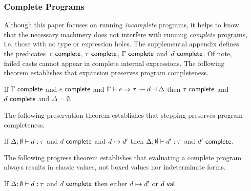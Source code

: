 \subsubsection{Complete Programs}
%
Although this paper focuses on running \emph{incomplete} programs, it helps
to know that the necessary machinery does not interfere
with running \emph{complete} programs, i.e. those
with no type or expression holes.
%
The supplemental appendix defines the predicates~$e~\mathsf{complete}$, $\tau~\mathsf{complete}$, $\Gamma~\mathsf{complete}$ and~$d~\mathsf{complete}$.
%
Of note, failed casts cannot appear in complete internal expressions.
%
The following theorem establishes that expansion preserves program completeness.

\begin{thm} 
      If $\Gamma~\mathsf{complete}$ and $e~\mathsf{complete}$
      and $\Gamma \vdash e \Rightarrow \tau \leadsto d \dashv \Delta$
      then $\tau~\mathsf{complete}$ and $d~\mathsf{complete}$ and $\Delta = \emptyset$.
\end{thm}

The following preservation theorem establishes that stepping preserves program completeness.
\begin{thm}
  If $\Delta; \emptyset \vdash d : \tau$
  and $d~\mathsf{complete}$
  and $d \mapsto d'$
  then $\Delta; \emptyset \vdash d' : \tau$
  and $d'~\mathsf{complete}$.
\end{thm}

The following progress theorem establishes that evaluating a complete
program always results in classic values, not boxed values nor
indeterminate forms.
%
\begin{thm}
  If $\Delta; \emptyset \vdash d : \tau$
  and $d~\mathsf{complete}$
  then either $d \mapsto d'$
  or $d~\mathsf{val}$.
\end{thm}



